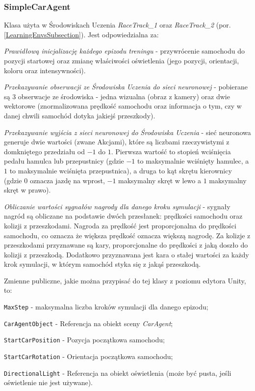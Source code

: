 \subsubsection{SimpleCarAgent}
Klasa użyta w Środowiskach Uczenia \textit{RaceTrack\_1} oraz \textit{RaceTrack\_2} (por. \ref{LearningEnvsSubsection}). Jest odpowiedzialna za:
\vspace*{-0.5cm}
\begin{enumerate*}
\item \textit{Prawidłową inicjalizację każdego epizodu treningu} - przywrócenie samochodu do pozycji startowej oraz zmianę właściwości oświetlenia (jego pozycji, orientacji, koloru oraz intensywności).
\item \textit{Przekazywanie obserwacji ze Środowiska Uczenia do sieci neuronowej} - pobierane są 3 obserwacje ze środowiska - jedna wizualna (obraz z kamery) oraz dwie wektorowe (znormalizowana prędkość samochodu oraz informacja o tym, czy w danej chwili samochód dotyka jakiejś przeszkody).
\item \textit{Przekazywanie wyjścia z sieci neuronowej do Środowiska Uczenia} - sieć neuronowa generuje dwie wartości (zwane Akcjami), które są liczbami rzeczywistymi z domkniętego przedziału od $-1$ do $1$. Pierwsza wartość to stopień wciśnięcia pedału hamulca lub przepustnicy (gdzie $-1$ to maksymalnie wciśnięty hamulec, a $1$ to maksymalnie wciśnięta przepustnica), a druga to kąt skrętu kierownicy (gdzie $0$ oznacza jazdę na wprost, $-1$ maksymalny skręt w lewo a $1$ maksymalny skręt w prawo).
\item \textit{Obliczanie wartości sygnałów nagrody dla danego kroku symulacji} - sygnały nagród są obliczane na podstawie dwóch przesłanek: prędkości samochodu oraz kolizji z przeszkodami. Nagroda za prędkość jest proporcjonalna do prędkości samochodu, co oznacza że większa prędkość oznacza większą nagrodę. Za kolizje z przeszkodami przyznawane są kary, proporcjonalne do prędkości z jaką doszło do kolizji z przeszkodą. Dodatkowo przyznawana jest kara o stałej wartości za każdy krok symulacji, w którym samochód styka się z jakąś przeszkodą.
\end{enumerate*}
\noindent
Zmienne publiczne, jakie można przypisać do tej klasy z poziomu edytora Unity, to:
\vspace*{-0.5cm}
\begin{itemize*}
\item \texttt{MaxStep} - maksymalna liczba kroków symulacji dla danego epizodu;
\item \texttt{CarAgentObject} - Referencja na obiekt sceny \textit{CarAgent};
\item \texttt{StartCarPosition} - Pozycja początkowa samochodu;
\item \texttt{StartCarRotation} - Orientacja początkowa samochodu;
\item \texttt{DirectionalLight} - Referencja na obiekt oświetlenia (może być pusta, jeśli oświetlenie nie jest używane).
\end{itemize*}

